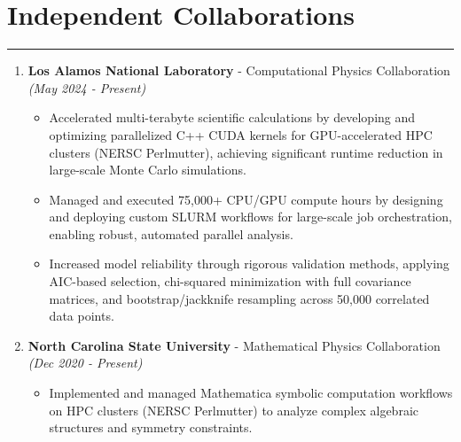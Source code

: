 \documentclass[11pt]{article}
\begin{document}
\section*{Independent Collaborations}
\hrule
\vspace{-0.3em}
\begin{enumerate}
    \item \textbf{Los Alamos National Laboratory} - Computational Physics Collaboration \hfill \textit{(May 2024 - Present)}
\vspace{-0.5em}
\begin{itemize}
    \item Accelerated multi-terabyte scientific calculations by developing and optimizing parallelized C++ CUDA kernels for GPU-accelerated HPC clusters (NERSC Perlmutter), achieving significant runtime reduction in large-scale Monte Carlo simulations.
    \vspace{-0.5em}
    \item Managed and executed 75,000+ CPU/GPU compute hours by designing and deploying custom SLURM workflows for large-scale job orchestration, enabling robust, automated parallel analysis.
    \vspace{-1.7em}
    \item Increased model reliability through rigorous validation methods, applying AIC-based selection, chi-squared minimization with full covariance matrices, and bootstrap/jackknife resampling across 50,000 correlated data points.
\end{itemize}

    \item  \textbf{North Carolina State University} - Mathematical Physics Collaboration \hfill \textit{(Dec 2020 - Present)}
\vspace{-0.5em}
\begin{itemize}
    \item Implemented and managed Mathematica symbolic computation workflows on HPC clusters (NERSC Perlmutter) to analyze complex algebraic structures and symmetry constraints.
\end{itemize}

\end{enumerate}

\vspace{0.5em}
\end{document}
